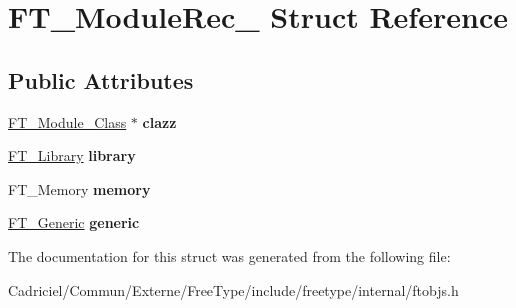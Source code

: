 \hypertarget{struct_f_t___module_rec__}{\section{F\-T\-\_\-\-Module\-Rec\-\_\- Struct Reference}
\label{struct_f_t___module_rec__}
}
\subsection*{Public Attributes}
\begin{DoxyCompactItemize}
\item 
\hypertarget{struct_f_t___module_rec___ac762573dc13af2d2af190a9e855742f5}{\hyperlink{struct_f_t___module___class__}{F\-T\-\_\-\-Module\-\_\-\-Class} $\ast$ {\bfseries clazz}}\label{struct_f_t___module_rec___ac762573dc13af2d2af190a9e855742f5}

\item 
\hypertarget{struct_f_t___module_rec___ac3d04fbdc2988bf9a39f4ad6d3cb4b5f}{\hyperlink{struct_f_t___library_rec__}{F\-T\-\_\-\-Library} {\bfseries library}}\label{struct_f_t___module_rec___ac3d04fbdc2988bf9a39f4ad6d3cb4b5f}

\item 
\hypertarget{struct_f_t___module_rec___a33113e9eb2d6cd8ee6666da75ff8e108}{F\-T\-\_\-\-Memory {\bfseries memory}}\label{struct_f_t___module_rec___a33113e9eb2d6cd8ee6666da75ff8e108}

\item 
\hypertarget{struct_f_t___module_rec___a860be13b9f239c42cacdbc5d6f81d44a}{\hyperlink{struct_f_t___generic__}{F\-T\-\_\-\-Generic} {\bfseries generic}}\label{struct_f_t___module_rec___a860be13b9f239c42cacdbc5d6f81d44a}

\end{DoxyCompactItemize}


The documentation for this struct was generated from the following file\-:\begin{DoxyCompactItemize}
\item 
Cadriciel/\-Commun/\-Externe/\-Free\-Type/include/freetype/internal/ftobjs.\-h\end{DoxyCompactItemize}
